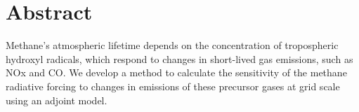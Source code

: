 \section*{Abstract}

Methane's atmospheric lifetime depends on the concentration of tropospheric hydroxyl radicals, which respond to changes in short-lived gas emissions, such as NOx and CO. We develop a method to calculate the sensitivity of the methane radiative forcing to changes in emissions of these precursor gases at grid scale using an adjoint model.
